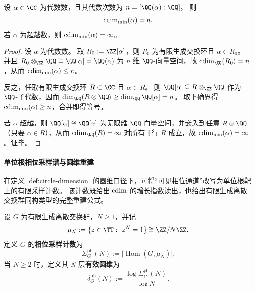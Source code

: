 \begin{theorem}[代数次数刻画最小圆秩]\label{thm:cdim-algebraic-degree-min-circle-rank}
设 \(\alpha\in\CC\) 为代数数，且其代数次数为 \(n=[\QQ(\alpha):\QQ]\)。
则
\[
\operatorname{cdim}_{\min}(\alpha)=n.
\]
若 \(\alpha\) 为超越数，则 \(\operatorname{cdim}_{\min}(\alpha)=\infty\)。
\end{theorem}
\begin{proof}
设 \(\alpha\) 为代数数。
取 \(R_0:=\ZZ[\alpha]\)，则 \(R_0\) 为有限生成交换环且 \(\alpha\in R_0\)。
并且
\(
R_0\otimes_{\ZZ}\QQ\cong \QQ[\alpha]=\QQ(\alpha)
\)
为 \(n\) 维 \(\QQ\)-向量空间，故 \(\cdim_{\QQ}(R_0)=n\)，从而 \(\operatorname{cdim}_{\min}(\alpha)\le n\)。
\par
反之，任取有限生成交换环 \(R\subset\CC\) 且 \(\alpha\in R\)。
则 \(\QQ[\alpha]\subseteq R\otimes_{\ZZ}\QQ\) 作为 \(\QQ\)-子代数，因而
\(
\dim_{\QQ}(R\otimes\QQ)\ge \dim_{\QQ}\QQ[\alpha]=n
\)。
取下确界得 \(\operatorname{cdim}_{\min}(\alpha)\ge n\)，合并即得等号。
\par
若 \(\alpha\) 超越，则 \(\QQ[\alpha]\cong\QQ[x]\) 为无限维 \(\QQ\)-向量空间，并嵌入到任意 \(R\otimes\QQ\)（只要 \(\alpha\in R\)），从而 \(\cdim_{\QQ}(R)=\infty\) 对所有可行 \(R\) 成立，故 \(\operatorname{cdim}_{\min}(\alpha)=\infty\)。证毕。
\end{proof}

\paragraph{单位根相位采样谱与圆维重建}
在定义 \ref{def:circle-dimension} 的圆维口径下，可将“可见相位通道”改写为单位根靶上的有限采样计数。
该计数既给出 \(\operatorname{cdim}\) 的增长指数读出，也给出有限生成离散交换群同构类型的完整重建公式。

\begin{definition}[相位采样计数与有效圆维]\label{def:cdim-phase-spectrum}
设 \(G\) 为有限生成离散交换群，\(N\ge 1\)，并记
\[
\mu_N:=\{z\in\TT:\ z^N=1\}\cong \ZZ/N\ZZ.
\]
定义 \(G\) 的\textbf{相位采样计数}为
\[
\Sigma_G^{\mathrm{ph}}(N):=\bigl|\operatorname{Hom}(G,\mu_N)\bigr|.
\]
当 \(N\ge 2\) 时，定义其 \(N\)-层\textbf{有效圆维}为
\[
\delta_G^{\mathrm{ph}}(N):=\frac{\log \Sigma_G^{\mathrm{ph}}(N)}{\log N}.
\]
\end{definition}

